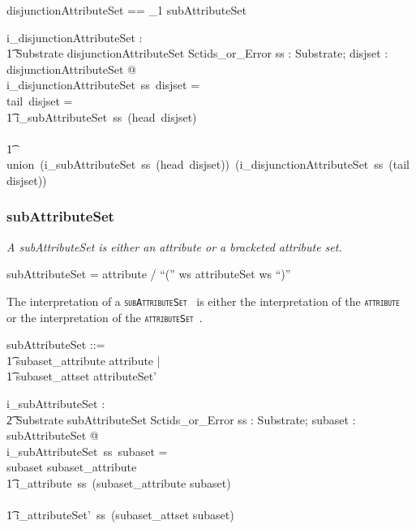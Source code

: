 \documentclass{article}
\def\spec#1{{\tt \small \textsc{{#1}} }}
\def\bnf#1{{\scriptsize {{#1}} }}
\def\desc#1{{\small \textsl{{#1}} }}
\begin{document}
\begin{zed}
disjunctionAttributeSet ==  \seq_1 subAttributeSet 
\end{zed}

\begin{axdef}
    i\_disjunctionAttributeSet : \\
\t1 Substrate \fun disjunctionAttributeSet \fun Sctids\_or\_Error
\where
   \forall ss : Substrate;  disjset : disjunctionAttributeSet @ \\
   i\_disjunctionAttributeSet~ss~disjset = ~ \\
   \IF tail~disjset = \langle \rangle \THEN \\
   \t1 i\_subAttributeSet~ss~(head~disjset) \\
\ELSE \\
\t1 union~(i\_subAttributeSet~ss~(head~disjset))~(i\_disjunctionAttributeSet~ss~(tail~disjset))
\end{axdef}

\subsubsection{subAttributeSet}
\begin{framed}
\desc{A subAttributeSet is either an attribute or a bracketed attribute set.}
\end{framed}
\begin{framed}
\noindent
\bnf{subAttributeSet = attribute / ``('' ws attributeSet ws ``)''}
\end{framed}

The interpretation of a \spec{subAttributeSet} is either the interpretation of the \spec{attribute} or the interpretation of the \spec{attributeSet}.

\begin{zed}
subAttributeSet ::= \\
\t1 subaset\_attribute \ldata attribute \rdata | \\
\t1 subaset\_attset \ldata attributeSet' \rdata
\end{zed}

\begin{axdef}
   i\_subAttributeSet : \\
\t2 Substrate \fun subAttributeSet \fun Sctids\_or\_Error
\where
   \forall ss : Substrate; subaset : subAttributeSet @ \\
   i\_subAttributeSet~ss~subaset = \\
   \IF subaset \in \ran subaset\_attribute \THEN \\
   \t1 i\_attribute~ss~(subaset\_attribute \inv subaset) \\
  \ELSE \\
  \t1 i\_attributeSet'~ss~(subaset\_attset \inv subaset)
\end{axdef}
\end{document}
